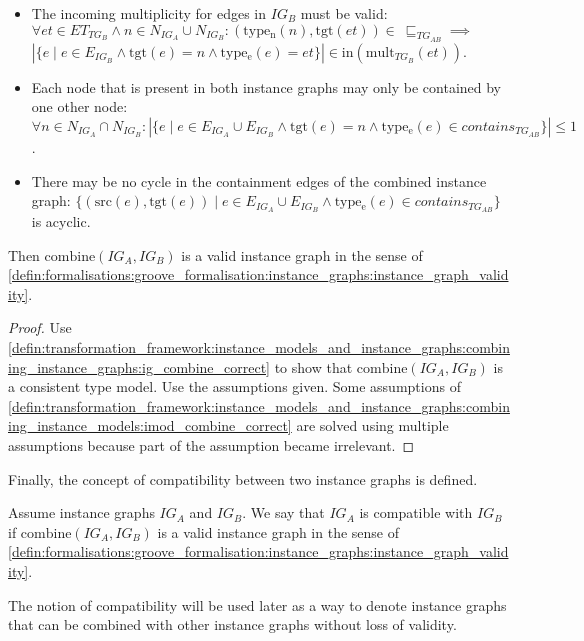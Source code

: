\begin{lem}
\begin{itemize}
    \item The incoming multiplicity for edges in $IG_B$ must be valid: $\forall et \in ET_{TG_B} \land n \in N_{IG_A} \cup N_{IG_B}\!: (\mathrm{type_n}(n), \mathrm{tgt}(et)) \in\ \sqsubseteq_{TG_{AB}} \implies$\\$|\{e \mid e \in E_{IG_B} \land \mathrm{tgt}(e) = n \land \mathrm{type_e}(e) = et \}| \in \mathrm{in}(\mathrm{mult}_{TG_{B}}(et))$.
    \item Each node that is present in both instance graphs may only be contained by one other node: $\forall n \in N_{IG_A} \cap N_{IG_B}\!: |\{e \mid e \in E_{IG_A} \cup E_{IG_B} \land \mathrm{tgt}(e) = n \land \mathrm{type_e}(e) \in contains_{TG_{AB}} \}| \leq 1$.
    \item There may be no cycle in the containment edges of the combined instance graph: $\{( \mathrm{src}(e), \mathrm{tgt}(e) ) \mid e \in E_{IG_A} \cup E_{IG_B} \land \mathrm{type_e}(e) \in contains_{TG_{AB}} \}$ is acyclic.
\end{itemize}

Then $\mathrm{combine}(IG_A, IG_B)$ is a valid instance graph in the sense of \cref{defin:formalisations:groove_formalisation:instance_graphs:instance_graph_validity}.
\end{lem}

\begin{proof}
Use \cref{defin:transformation_framework:instance_models_and_instance_graphs:combining_instance_graphs:ig_combine_correct} to show that $\mathrm{combine}(IG_A, IG_B)$ is a consistent type model. Use the assumptions given. Some assumptions of \cref{defin:transformation_framework:instance_models_and_instance_graphs:combining_instance_models:imod_combine_correct} are solved using multiple assumptions because part of the assumption became irrelevant.
\end{proof}

Finally, the concept of compatibility between two instance graphs is defined.

\begin{defin}
\label{defin:transformation_framework:instance_models_and_instance_graphs:combining_instance_graphs:compatibility}
Assume instance graphs $IG_A$ and $IG_B$. We say that $IG_A$ is compatible with $IG_B$ if  $\mathrm{combine}(IG_A, IG_B)$ is a valid instance graph in the sense of \cref{defin:formalisations:groove_formalisation:instance_graphs:instance_graph_validity}.
\end{defin}

The notion of compatibility will be used later as a way to denote instance graphs that can be combined with other instance graphs without loss of validity.